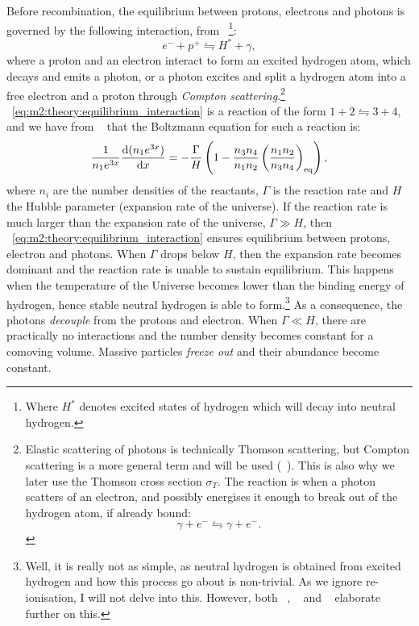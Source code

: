     Before recombination, the equilibrium between protons, electrons and photons is governed by the following interaction, from ~\cite{weinberg2008cosmology}\footnote{Where $H^*$ denotes excited states of hydrogen which will decay into neutral hydrogen.}:
    \begin{equation}\label{eq:m2:theory:equilibrium_interaction}
        e^-+p^+\leftrightharpoons H^* + \gamma,
    \end{equation}
    where a proton and an electron interact to form an excited hydrogen atom, which decays and emits a photon, or a photon excites and split a hydrogen atom into a free electron and a proton through \textit{Compton scattering}.\footnote{Elastic scattering of photons is technically Thomson scattering, but Compton scattering is a more general term and will be used (~\cite{dodelson2020modern}). This is also why we later use the Thomson cross section $\sigma_T$. The reaction is when a photon scatters of an electron, and possibly energises it enough to break out of the hydrogen atom, if already bound: $$\gamma + e^- \leftrightharpoons \gamma+e^-.$$} ~\cref{eq:m2:theory:equilibrium_interaction} is a reaction of the form $1+2\leftrightharpoons 3+4$, and we have from ~\cite{AST5220LectureNotes} that the Boltzmann equation for such a reaction is:
    \begin{equation}\label{eq:m2:theory:boltzmann_eq}
        \frac{1}{n_1e^{3x}}\dv{(n_1e^{3x})}{x} = -\frac{\Gamma}{H}\left(1-\frac{n_3n_4}{n_1n_2}\left(\frac{n_1n_2}{n_3n_4}\right)_\mathrm{eq}\right),
    \end{equation}
    where $n_i$ are the number densities of the reactants, $\Gamma$ is the reaction rate and $H$ the Hubble parameter (expansion rate of the universe). If the reaction rate is much larger than the expansion rate of the universe, $\Gamma \gg H$, then ~\cref{eq:m2:theory:equilibrium_interaction} ensures equilibrium between protons, electron and photons. When $\Gamma$ drops below $H$, then the expansion rate becomes dominant and the reaction rate is unable to sustain equilibrium. This happens when the temperature of the Universe becomes lower than the binding energy of hydrogen, hence stable neutral hydrogen is able to form.\footnote{Well, it is really not as simple, as neutral hydrogen is obtained from excited hydrogen and how this process go about is non-trivial. As we ignore re-ionisation, I will not delve into this. However, both ~\cite[p. 113-129]{weinberg2008cosmology}, ~\cite[p. 95-99]{dodelson2020modern} and ~\cite{AST5220LectureNotes} elaborate further on this.} As a consequence, the photons \textit{decouple} from the protons and electron. When $\Gamma \ll H$, there are practically no interactions and the number density becomes constant for a comoving volume. Massive particles \textit{freeze out} and their abundance become constant. 

